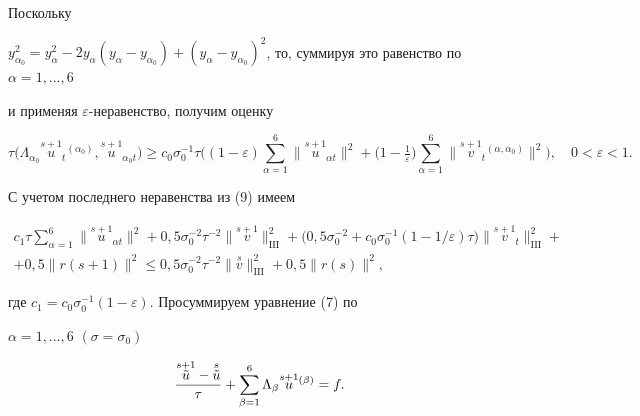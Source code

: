 Поскольку


$y_{\alpha_0}^2=y_\alpha^2-2y_\alpha(y_\alpha-y_{\alpha_0})+


(y_\alpha-y_{\alpha_0})^2$, то, суммируя это равенство по $\alpha=1,\dotsc,6$


и применяя $\varepsilon$-неравенство, получим оценку


\begin{equation}


\tau\bigl(\Lambda_{\alpha_0}\overset{s+1}{u}_{\!\!\!t}{}^{(\alpha_0)},


\overset{s+1}{u}_{\!\!\!\alpha_0 t}\bigr)\geq c_0\sigma_0^{-1}\tau


\biggl((1-\varepsilon)\sum_{\alpha=1}^6\|\overset{s+1}{u}_


{\!\!\!\alpha t}\|^2+\bigl(1-\tfrac{1}{\varepsilon}\bigr)\sum_{\alpha=1}^6


\|\overset{s+1}{v}_{\!\!\!\!t}{}^{(\alpha,\alpha_0)}\|^2\biggr),\quad


0<\varepsilon<1.


\end{equation}


С учетом последнего неравенства из (9) имеем


\begin{multline}


c_1\tau\sum_{\alpha=1}^6\|\overset{s+1}{u}_{\!\!\!\alpha t}\|^2+


0,5\sigma_0^{-2}\tau^{-2}\|\overset{s+1}{v}\big\|_{\mathrm{III}}^2+


\bigl(0,5\sigma_0^{-2}+c_0\sigma_0^{-1}(1-1/\varepsilon)\tau\bigr)


\|\overset{s+1}{v}_{\!\!\!t}\big\|_{\mathrm{III}}^2+ \\


%


+0,5\|r(s+1)\|^2 \leq 0,5\sigma_0^{-2}\tau^{-2}


\|\overset{s}{v}\big\|_{\mathrm{III}}^2+0,5\|r(s)\|^2,


\end{multline}


где $c_1=c_0\sigma_0^{-1}(1-\varepsilon)$. Просуммируем уравнение (7) по


$\alpha=1,\dotsc,6$ $(\sigma=\sigma_0)$


\begin{equation}


\frac{\overset{s+1}{\tilde u}-\overset{s}{\tilde u}}{\tau}+


\sum_{\beta=1}^6\Lambda_\beta\ussb=f.


\end{equation}


